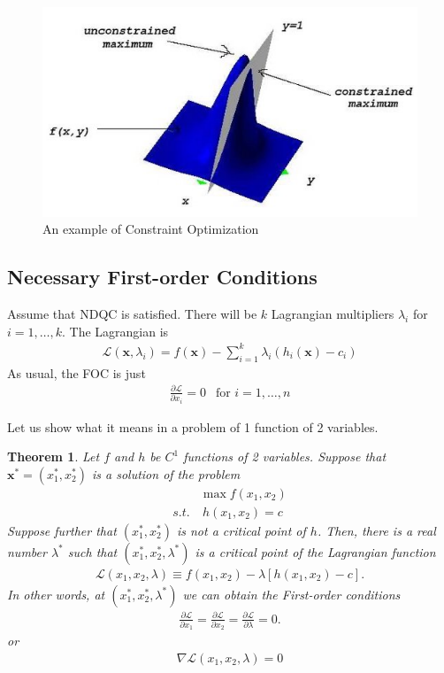 \documentclass[11pt,a4paper]{book}
\newtheorem{theorem}{Theorem}[section]
\theoremstyle{definition}\newtheorem{definition}{Definition}
\theoremstyle{definition}\newtheorem{fact}{Fact}
\theoremstyle{definition}\newtheorem{remark}{Remark}
\theoremstyle{definition}\newtheorem{ex}{Ex.}
\theoremstyle{definition}\newtheorem{project}{Project}
\theoremstyle{definition}\newtheorem{problem}{Problem}
\theoremstyle{definition}\newtheorem{example}{Example}
\newenvironment{ftheorem}
{\begin{mdframed}\begin{theorem}}
		{\end{theorem}\end{mdframed}}
\numberwithin{theorem}{section}
\numberwithin{corollary}{chapter}
\numberwithin{assumption}{chapter}
\numberwithin{definition}{chapter}
\numberwithin{prop}{chapter}
\numberwithin{notation}{chapter}
\numberwithin{problem}{chapter}
\numberwithin{example}{chapter}
\numberwithin{fact}{chapter}
\numberwithin{ex}{chapter}
\def\x{\mathbf x}
\begin{document}
	\begin{figure}[ht]
		\centering
		\includegraphics[scale=0.7]{figs/cons_vs_uncons.jpg}
		\caption{An example of Constraint Optimization}
	\end{figure}
		
	\subsection{Necessary First-order Conditions}
	Assume that NDQC is satisfied. There will be $k$ Lagrangian multipliers $\lambda_i$ for  $i = 1, \dots, k$. The Lagrangian is
	\begin{align*}
		\mathcal{L} (\x, \lambda_i) = f(\x) - \sum^k_{i=1} \lambda_i (h_i(\x) - c_i) 
	\end{align*}
	As usual, the FOC is just
	\begin{align*}
		\frac{\partial \mathcal{L}}{\partial x_i} = 0  \ \ \text{ for $i=1,\dots,n$}
	\end{align*}
	
	Let us show what it means in a problem of 1 function of 2 variables.
		\begin{ftheorem}
		Let $f$ and $h$ be $C^1$ functions of 2 variables. Suppose that $\x^* = (x^*_1, x^*_2)$ is a solution of the problem
		\begin{align*}
			& \max f(x_1,x_2)   \\
			s.t. & \ h(x_1, x_2) = c 
		\end{align*}
		Suppose further that $(x^*_1, x^*_2)$ is not a critical point of $h$. Then, there is a real number $\lambda^*$ such that $(x^*_1, x^*_2, \lambda^*)$ is a critical point of the Lagrangian function
		\begin{align*}
			\mathcal{L} (x_1, x_2, \lambda) \equiv f(x_1, x_2) - \lambda [ h(x_1, x_2) - c]. 
		\end{align*}
		In other words, at $(x^*_1, x^*_2, \lambda^*)$ we can obtain the First-order conditions 
		\begin{align*}
			\frac{\partial \mathcal{L}}{\partial x_1} = 
			\frac{\partial \mathcal{L}}{\partial x_2} = 
			\frac{\partial \mathcal{L}}{\partial \lambda} = 0.
		\end{align*}
		or
		\begin{align*}
			\nabla \mathcal{L} (x_1, x_2, \lambda) = 0
		\end{align*}
	\end{ftheorem}
	
\end{document}

